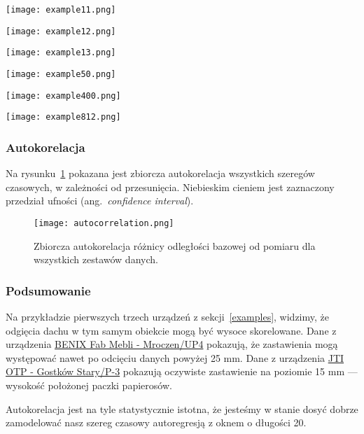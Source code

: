\texttt{[image: example11.png]}

\texttt{[image: example12.png]}

\texttt{[image: example13.png]}

\texttt{[image: example50.png]}

\texttt{[image: example400.png]}\label{mroczen}

\texttt{[image: example812.png]}\label{jti}

\subsubsection{Autokorelacja}\label{autocorrelation}

Na rysunku~\ref{fig:autocorrelation} pokazana jest zbiorcza autokorelacja wszystkich szeregów czasowych, w zależności od przesunięcia.
Niebieskim cieniem jest zaznaczony przedział ufności (ang.\ \emph{confidence interval}).
\begin{figure}[h]
    \texttt{[image: autocorrelation.png]}
    \caption{Zbiorcza autokorelacja różnicy odległości bazowej od pomiaru dla wszystkich zestawów danych.}
    \label{fig:autocorrelation}
\end{figure}

\subsubsection{Podsumowanie}
Na przykładzie pierwszych trzech urządzeń z sekcji~\ref{examples}, widzimy, że odgięcia dachu w tym samym obiekcie mogą być wysoce skorelowane.
Dane z urządzenia \hyperref[mroczen]{BENIX Fab Mebli - Mroczen/UP4} pokazują, że zastawienia mogą występować nawet po odcięciu danych powyżej 25 mm.
Dane z urządzenia \hyperref[jti]{JTI OTP - Gostków Stary/P-3} pokazują oczywiste zastawienie na poziomie 15 mm — wysokość położonej paczki papierosów.

Autokorelacja jest na tyle statystycznie istotna, że jesteśmy w stanie dosyć dobrze zamodelować nasz szereg czasowy autoregresją z oknem o długości 20.
